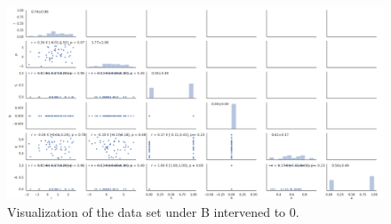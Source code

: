 \documentclass[12pt,fleqn,]{article}
\begin{document}
\begin{figure}[H]
	\centering
	\includegraphics[width=\linewidth]{interB0data}
	\caption{Visualization of the data set under B intervened to 0. }
	\label{fig:interB0data}
\end{figure}
\end{document}
